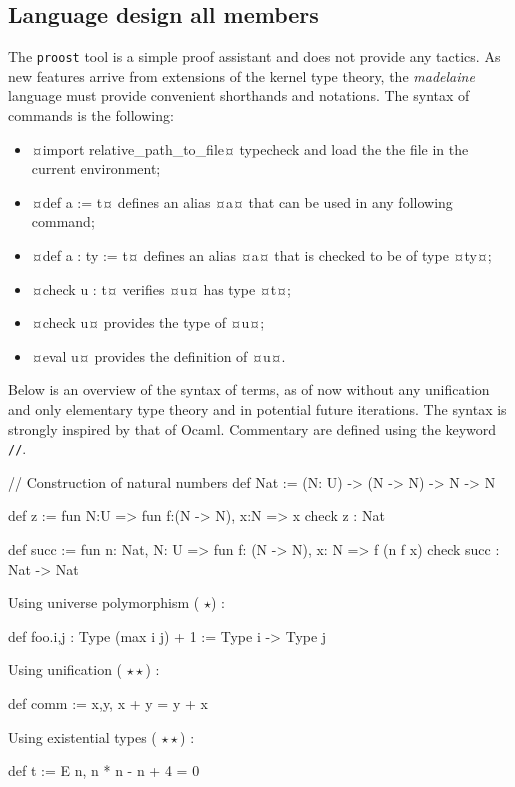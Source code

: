 \documentclass[twocolumn]{article}
\newcommand{\members}[1]{\texorpdfstring{\hfill\scriptsize #1}{}}
\newcommand{\etun}{({\color{Green} $\star$}) }
\newcommand{\etde}{({\color{Orange} $\star\star$}) }
\begin{document}
\subsection{Language design \members{all members}}
The \texttt{proost} tool is a simple proof assistant and does not provide any
tactics. As new features arrive from extensions of the kernel type theory, the
\emph{madelaine} language must provide convenient shorthands and notations. The syntax of commands is the following:
\begin{itemize}
  \item ¤import relative_path_to_file¤ typecheck and load the the file in the current environment;
  \item ¤def a := t¤ defines an alias ¤a¤ that can be used in any following command;
  \item ¤def a : ty := t¤ defines an alias ¤a¤ that is checked to be of type ¤ty¤;
  \item ¤check u : t¤ verifies ¤u¤ has type ¤t¤;
  \item ¤check u¤ provides the type of ¤u¤;
  \item ¤eval u¤ provides the definition of ¤u¤.\\
\end{itemize}

Below is an overview of the syntax of terms, as of now without any unification and only elementary type theory and in potential future iterations. The syntax is strongly inspired by that of Ocaml. Commentary are defined using the keyword \texttt{//}.
\begin{proost}
// Construction of natural numbers
def Nat :=
(N: U) -> (N -> N) -> N -> N

def z :=
fun N:U => fun f:(N -> N), x:N => x
check z : Nat

def succ := fun n: Nat, N: U =>
fun f: (N -> N), x: N => f (n f x)
check succ : Nat -> Nat
\end{proost}

Using universe polymorphism \etun:
\begin{proost}
def foo.{i,j} : Type (max i j) + 1
:= Type i -> Type j
\end{proost}

Using unification \etde:
\begin{proost}
def comm := \/ x,y, x + y = y + x
\end{proost}

Using existential types \etde:
\begin{proost}
def t := E n, n * n - n + 4 = 0
\end{proost}
\end{document}
